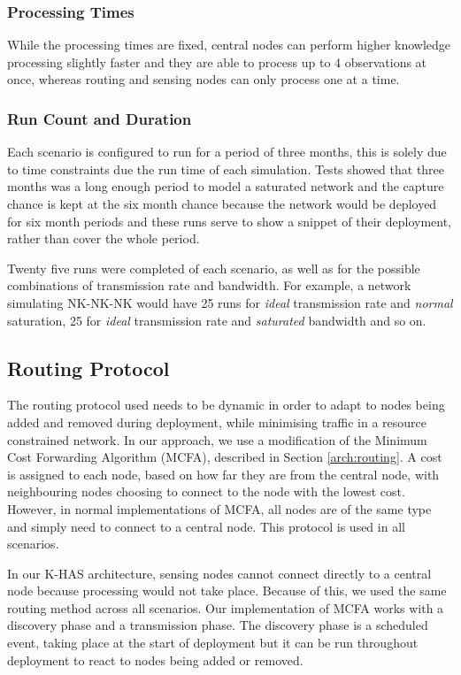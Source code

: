 	\subsubsection{Processing Times}
	While the processing times are fixed, central nodes can perform higher knowledge processing slightly faster and they are able to process up to 4 observations at once, whereas routing and sensing nodes can only process one at a time.
	
	\subsubsection{Run Count and Duration}
	Each scenario is configured to run for a period of three months, this is solely due to time constraints due the run time of each simulation. Tests showed that three months was a long enough period to model a saturated network and the capture chance is kept at the six month chance because the network would be deployed for six month periods and these runs serve to show a snippet of their deployment, rather than cover the whole period.
	
	Twenty five runs were completed of each scenario, as well as for the possible combinations of transmission rate and bandwidth. For example, a network simulating NK-NK-NK would have 25 runs for \textit{ideal} transmission rate and \textit{normal} saturation, 25 for \textit{ideal} transmission rate and \textit{saturated} bandwidth and so on.

\subsection{Routing Protocol}
The routing protocol used needs to be dynamic in order to adapt to nodes being added and removed during deployment, while minimising traffic in a resource constrained network. In our approach, we use a modification of the Minimum Cost Forwarding Algorithm (MCFA), described in Section \ref{arch:routing}. A cost is assigned to each node, based on how far they are from the central node, with neighbouring nodes choosing to connect to the node with the lowest cost. However, in normal implementations of MCFA, all nodes are of the same type and simply need to connect to a central node. This protocol is used in all scenarios.

In our K-HAS architecture, sensing nodes cannot connect directly to a central node because processing would not take place. Because of this, we used the same routing method across all scenarios. Our implementation of MCFA works with a discovery phase and a transmission phase. The discovery phase is a scheduled event, taking place at the start of deployment but it can be run throughout deployment to react to nodes being added or removed. 

